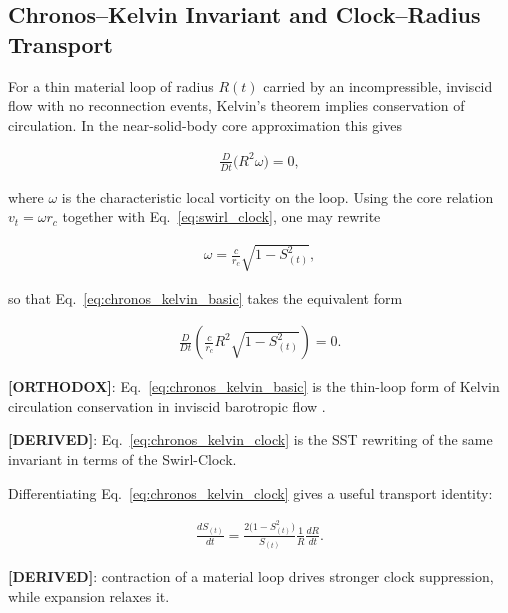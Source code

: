 \documentclass[11pt]{article}
\theoremstyle{definition}
\theoremstyle{plain}
\theoremstyle{remark}
\newcommand{\rc}{{r_c}}
\begin{document}
    \subsection{Chronos--Kelvin Invariant and Clock--Radius Transport}
        \label{subsec:chronos_kelvin}

        For a thin material loop of radius $R(t)$ carried by an incompressible, inviscid flow with no reconnection events, Kelvin's theorem implies conservation of circulation. In the near-solid-body core approximation this gives

        \begin{align}
            \frac{D}{Dt}\!\bigl(R^2 \omega\bigr) = 0,
            \label{eq:chronos_kelvin_basic}
        \end{align}

        where $\omega$ is the characteristic local vorticity on the loop. Using the core relation $v_t = \omega \rc$ together with Eq.~\eqref{eq:swirl_clock}, one may rewrite

        \begin{align}
            \omega = \frac{c}{\rc}\sqrt{1-S_{(t)}^2},
        \end{align}

        so that Eq.~\eqref{eq:chronos_kelvin_basic} takes the equivalent form

        \begin{align}
            \frac{D}{Dt}\left(\frac{c}{\rc} R^2 \sqrt{1-S_{(t)}^2}\right) = 0.
            \label{eq:chronos_kelvin_clock}
        \end{align}

        \textbf{[ORTHODOX]}: Eq.~\eqref{eq:chronos_kelvin_basic} is the thin-loop form of Kelvin circulation conservation in inviscid barotropic flow \cite{Batchelor1967,Saffman1992}.

        \textbf{[DERIVED]}: Eq.~\eqref{eq:chronos_kelvin_clock} is the SST rewriting of the same invariant in terms of the Swirl-Clock.

        Differentiating Eq.~\eqref{eq:chronos_kelvin_clock} gives a useful transport identity:

        \begin{align}
            \frac{dS_{(t)}}{dt}
            =
            \frac{2\bigl(1-S_{(t)}^2\bigr)}{S_{(t)}}
            \frac{1}{R}\frac{dR}{dt}.
            \label{eq:clock_radius_transport}
        \end{align}

        \textbf{[DERIVED]}: contraction of a material loop drives stronger clock suppression, while expansion relaxes it.
\end{document}
